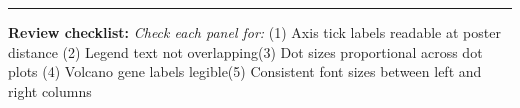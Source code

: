 \documentclass[11pt, a3paper, landscape]{article}
\begin{document}
\vspace{0.3cm}
\hrule
\vspace{0.2cm}

{\sffamily\footnotesize\textbf{Review checklist:}
\textit{Check each panel for:} (1) Axis tick labels readable at poster distance\quad
(2) Legend text not overlapping\quad (3) Dot sizes proportional across dot plots\quad
(4) Volcano gene labels legible\quad (5) Consistent font sizes between left and right columns}
\end{document}
